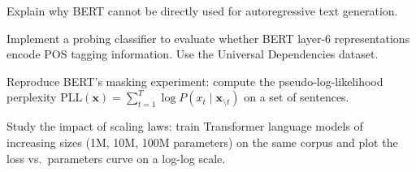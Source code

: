 \begin{exercise}[$\star$]
Explain why BERT cannot be directly used for autoregressive text generation.
\end{exercise}

\begin{exercise}[$\star\star$]
Implement a probing classifier to evaluate whether BERT layer-6 representations
encode POS tagging information. Use the Universal Dependencies dataset.
\end{exercise}

\begin{exercise}[$\star\star$]
Reproduce BERT's masking experiment: compute the pseudo-log-likelihood
perplexity
$\text{PLL}(\mathbf{x}) = \sum_{t=1}^{T} \log P(x_t \mid \mathbf{x}_{\setminus t})$
on a set of sentences.
\end{exercise}

\begin{exercise}[$\star\star\star$]
Study the impact of scaling laws: train Transformer language models of
increasing sizes (1M, 10M, 100M parameters) on the same corpus and plot the
loss vs.\ parameters curve on a log-log scale.
\end{exercise}

